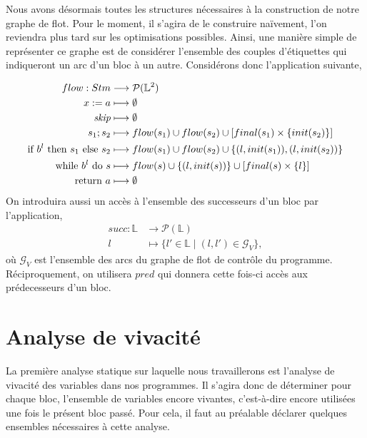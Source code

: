 \documentclass[a4paper, 10pt]{article}
\begin{document}
Nous avons désormais toutes les structures nécessaires à la construction de notre graphe de flot. Pour le moment, il s'agira de 
le construire naïvement, l'on reviendra plus tard sur les optimisations possibles. Ainsi, une manière simple de représenter ce 
graphe est de considérer l'ensemble des couples d'étiquettes qui indiqueront un arc d'un bloc à un autre. 
Considérons donc l'application suivante, 

\begin{align*}
	flow : Stm &\longrightarrow \mathcal{P}(\mathbb{L}^2) \\
	{x}\space:=\space{a} &\longmapsto \emptyset \\
	\textit{skip} &\longmapsto \emptyset \\
	{s_1}\space;\space{s_2} &\longmapsto flow(s_1) \cup flow(s_2) \cup [final(s_1)\times\{init(s_2)\}] \\
	\text{if }{b^l}\text{ then }{s_1}\text{ else }{s_2} &\longmapsto flow(s_1)\cup flow(s_2)\cup\{(l, init(s_1)),(l, init(s_2))\} \\
	\text{while }{b^l}\text{ do }{s} &\longmapsto flow(s)\cup\{(l,init(s))\}\cup[final(s)\times\{l\}]\\
	\text{return }{a} &\longmapsto \emptyset
\end{align*}
On introduira aussi un accès à l'ensemble des successeurs d'un bloc par l'application,
\begin{align*}
	succ : \mathbb{L} &\longrightarrow \mathcal{P}(\mathbb{L})\\
	l &\longmapsto \{l' \in \mathbb{L} \mid (l, l') \in \mathcal{G}_V\},
\end{align*}
où $\mathcal{G}_V$ est l'ensemble des arcs du graphe de flot de contrôle du programme. Réciproquement, on 
utilisera $pred$ qui donnera cette fois-ci accès aux prédecesseurs d'un bloc.

\section{Analyse de vivacité}
La première analyse statique sur laquelle nous travaillerons est l'analyse de vivacité des variables dans nos programmes. 
Il s'agira donc de déterminer pour chaque bloc, l'ensemble de variables encore vivantes, c'est-à-dire
encore utilisées une fois le présent bloc passé. Pour cela, il faut au préalable déclarer quelques ensembles 
nécessaires à cette analyse.
\end{document}
